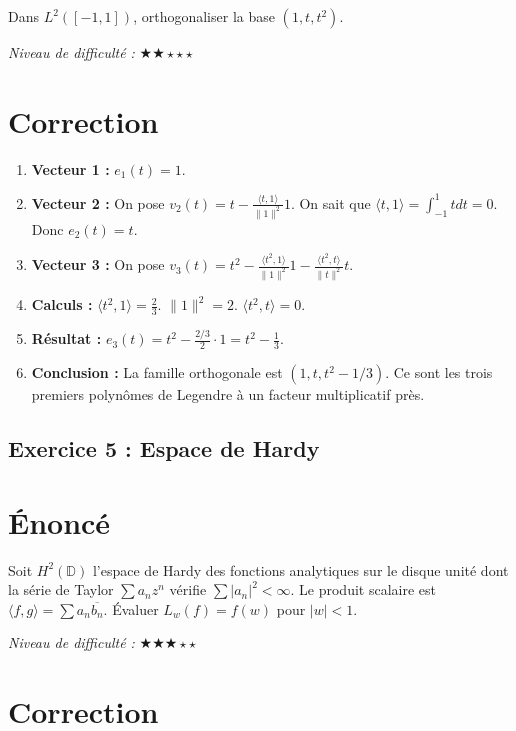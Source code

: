 \documentclass[11pt,a4paper]{article}
\begin{document}
Dans $L^2([-1, 1])$, orthogonaliser la base $(1, t, t^2)$.

\textit{Niveau de difficulté :} $\bigstar\bigstar\star\star\star$

\section{Correction}

\begin{enumerate}
\item \textbf{Vecteur 1 :} $e_1(t) = 1$.
\item \textbf{Vecteur 2 :} On pose $v_2(t) = t - \frac{\langle t, 1 \rangle}{\|1\|^2} 1$. On sait que $\langle t, 1 \rangle = \int_{-1}^1 t dt = 0$. Donc $e_2(t) = t$.
\item \textbf{Vecteur 3 :} On pose $v_3(t) = t^2 - \frac{\langle t^2, 1 \rangle}{\|1\|^2} 1 - \frac{\langle t^2, t \rangle}{\|t\|^2} t$.
\item \textbf{Calculs :} $\langle t^2, 1 \rangle = \frac{2}{3}$. $\|1\|^2 = 2$. $\langle t^2, t \rangle = 0$.
\item \textbf{Résultat :} $e_3(t) = t^2 - \frac{2/3}{2} \cdot 1 = t^2 - \frac{1}{3}$.
\item \textbf{Conclusion :} La famille orthogonale est $(1, t, t^2 - 1/3)$. Ce sont les trois premiers polynômes de Legendre à un facteur multiplicatif près.
\end{enumerate}


\subsection*{Exercice 5 : Espace de Hardy}

\section{Énoncé}

Soit $H^2(\mathbb{D})$ l'espace de Hardy des fonctions analytiques sur le disque unité dont la série de Taylor $\sum a_n z^n$ vérifie $\sum |a_n|^2 < \infty$. Le produit scalaire est $\langle f, g \rangle = \sum a_n \overline{b_n}$. Évaluer $L_w(f) = f(w)$ pour $|w| < 1$.

\textit{Niveau de difficulté :} $\bigstar\bigstar\bigstar\star\star$

\section{Correction}
\end{document}
